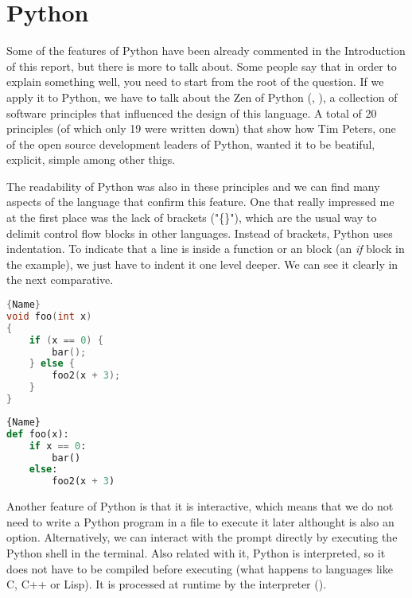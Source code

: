\section{Python}
\label{sec:python}
Some of the features of Python have been already commented in the Introduction of this report, but there is more to talk about. Some people say that in order to explain something well, you need to start from the root of the question. If we apply it to Python, we have to talk about the Zen of Python (\cite{origin_zen_of_python}, \cite{zen_of_python}), a collection of software principles that influenced the design of this language. A total of 20 principles (of which only 19 were written down) that show how Tim Peters, one of the open source development leaders of Python, wanted it to be beatiful, explicit, simple among other thigs.

The readability of Python was also in these principles and we can find many aspects of the language that confirm this feature. One that really impressed me at the first place was the lack of brackets ("\{\}"), which are the usual way to delimit control flow blocks in other languages. Instead of brackets, Python uses indentation. To indicate that a line is inside a function or an block (an \textit{if} block in the example), we just have to indent it one level deeper. We can see it clearly in the next comparative.

\noindent\begin{minipage}[t]{.45\textwidth}
\begin{lstlisting}[caption=C code,frame=tlrb, language=C]{Name}
void foo(int x)
{
    if (x == 0) {
        bar();
    } else {
        foo2(x + 3);
    }
}
\end{lstlisting}
\end{minipage}\hfill
\begin{minipage}[t]{.45\textwidth}
\begin{lstlisting}[caption=Python code,frame=tlrb, language=Python]{Name}
def foo(x):
    if x == 0:
        bar()
    else:
        foo2(x + 3)
\end{lstlisting}
\end{minipage}

Another feature of Python is that it is interactive, which means that we do not need to write a Python program in a file to execute it later althought is also an option. Alternatively, we can interact with the prompt directly by executing the Python shell in the terminal. Also related with it, Python is interpreted, so it does not have to be compiled before executing (what happens to languages like C, C++ or Lisp). It is processed at runtime by the interpreter (\cite{python_overview}). 

